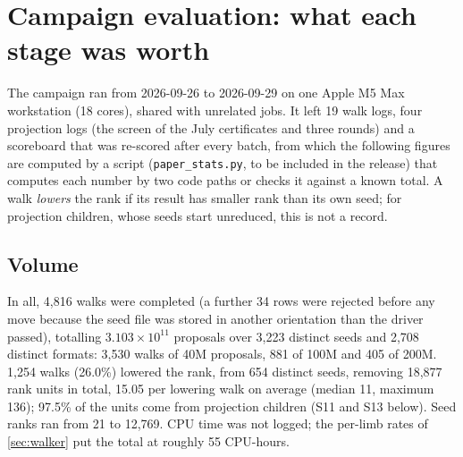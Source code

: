 \section{Campaign evaluation: what each stage was worth}\label{sec:eval}

The campaign ran from 2026-09-26 to 2026-09-29 on one Apple M5 Max workstation (18 cores), shared with unrelated jobs. It left 19 walk logs, four projection logs (the screen of the July certificates and three rounds) and a scoreboard that was re-scored after every batch, from which the following figures are computed by a script (\texttt{paper\_stats.py}, to be included in the release) that computes each number by two code paths or checks it against a known total.
A walk \emph{lowers} the rank if its result has smaller rank than its own seed; for projection children, whose seeds start unreduced, this is not a record.

\subsection{Volume}
In all, 4{,}816 walks were completed (a further 34 rows were rejected before any move because the seed file was stored in another orientation than the driver passed), totalling $3.103\times10^{11}$ proposals over 3{,}223 distinct seeds and 2{,}708 distinct formats: 3{,}530 walks of 40M proposals, 881 of 100M and 405 of 200M.
1{,}254 walks (26.0\%) lowered the rank, from 654 distinct seeds, removing 18{,}877 rank units in total, 15.05 per lowering walk on average (median 11, maximum 136); 97.5\% of the units come from projection children (S11 and S13 below).
Seed ranks ran from 21 to 12{,}769. CPU time was not logged; the per-limb rates of \cref{sec:walker} put the total at roughly 55 CPU-hours.

